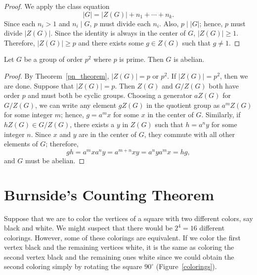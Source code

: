  
\begin{proof}
We apply the class equation
\[
|G| = |Z(G)|  + n_1 + \cdots + n_k.
\]
Since each $n_i>1$ and $n_i \mid G$, $p$  must divide each $n_i$.
Also, $p \mid |G|$; hence, $p$ must divide $|Z(G)|$. Since the
identity is always in the center of $G$, $|Z(G)| \geq 1$. Therefore,
$|Z(G)|  \geq p$ and there exists some $g \in Z(G)$ such that $g \neq
1$. 
\mbox{\hspace*{1in}} 
\end{proof}
 
 
\begin{corollary}
Let $G$ be a group of order $p^2$ where $p$ is prime. Then $G$ is
abelian. 
\end{corollary}
 
 
\begin{proof}
By Theorem~\ref{pn_theorem}, $|Z(G)| = p$ or $p^2$.  If $|Z(G)| = p^2$, then
we are done.  Suppose that $|Z(G)| = p$. Then $Z(G)$ and $G / Z(G)$
both have order $p$ and must both be cyclic groups.  Choosing  a
generator $aZ(G)$ for $G / Z(G)$, we can write any element $gZ(G)$ in
the quotient group as $a^m Z(G)$ for some integer $m$; hence, $g = a^m
x$ for some $x$ in the center of $G$.  Similarly, if $hZ(G) \in G /
Z(G)$, there exists a $y$ in $Z(G)$ such that $h = a^n y$ for some
integer $n$.  Since $x$ and $y$ are in the center of $G$, they commute
with all other elements of $G$; therefore, 
\[
gh  =  a^m x a^n y =  a^{m+n} x y = a^n y a^m x = hg,
\]
and $G$ must be abelian.
\end{proof}
 
 
 
\section{Burnside's Counting Theorem}
 
 
 
Suppose that we are to color the vertices of a square with two
different colors, say black and white.  We might suspect that there
would be $2^4=16$ different colorings. However, some of these
colorings are equivalent.  If we color the first vertex black and the
remaining vertices white, it is the same as coloring the second vertex
black and the remaining ones white since we could obtain the second
coloring simply by rotating the square $90^\circ$
(Figure~\ref{colorings}). 
 
